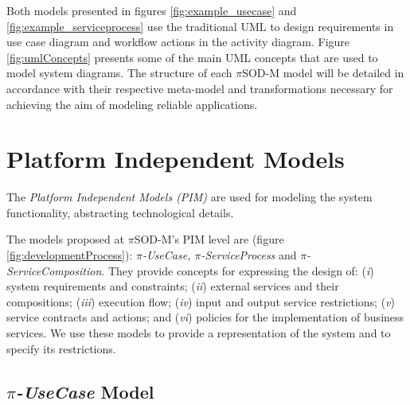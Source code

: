 Both models presented in figures \ref{fig:example_usecase} and \ref{fig:example_serviceprocess} use the
 traditional UML to design requirements in use case diagram and workflow actions
in the activity diagram. Figure \ref{fig:umlConcepts} presents
some of the main UML concepts that are used to model system diagrams. The
structure of each $\pi$SOD-M model will be detailed in accordance with their
respective meta-model and transformations necessary for achieving the aim of modeling
reliable applications.  
 

\section{Platform Independent Models}
\label{sec:pim-pisodm}


The \textit{Platform Independent Models (PIM)} are used for modeling the
system functionality, abstracting technological details. 


The models proposed at $\pi$SOD-M's PIM level are (figure
\ref{fig:developmentProcess}): \textit{ $\pi$-UseCase, $\pi$-ServiceProcess} and \textit{
$\pi$-ServiceComposition}. They provide concepts for expressing the design of:
(\textit{i}) system requirements and constraints; (\textit{ii}) external
services and their compositions; (\textit{iii}) execution flow; (\textit{iv})
input and output service restrictions; (\textit{v}) service contracts and
actions; and (\textit{vi}) policies for the implementation of business services.
We use these models to provide a representation of the system and to
specify its restrictions. 



\subsection{\textit{$\pi$-UseCase} Model}


